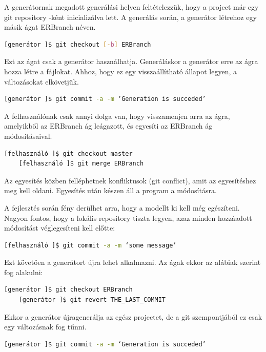\documentclass[a4paper,12pt,oneside]{report}
\begin{document}
\begin{justify}
	A generátornak megadott generálási helyen feltételezzük, hogy a project már egy git repository -ként inicializálva lett. A generálás során, a generátor létrehoz egy másik ágat ERBranch néven. 

	\begin{lstlisting}[language=bash]
	[generátor ]$ git checkout [-b] ERBranch 
	\end{lstlisting}

	Ezt az ágat csak a generátor használhatja. Generáláskor a generátor erre az ágra hozza létre a fájlokat. Ahhoz, hogy ez egy visszaállítható állapot legyen, a változásokat elkövetjük. 

	\begin{lstlisting}[language=bash]
	[generátor ]$ git commit -a -m ‘Generation is succeded’
	\end{lstlisting}

	A felhasználónak csak annyi dolga van, hogy visszamenjen arra az ágra, amelyikből az ERBranch ág leágazott, és egyesíti az ERBranch ág módosításaival.

	\begin{lstlisting}[language=bash]
	[felhasználó ]$ git checkout master
	[felhasználó ]$ git merge ERBranch
	\end{lstlisting}

	Az egyesítés közben felléphetnek konfliktusok (git conflict), amit az egyesítéshez meg kell oldani. Egyesítés után készen áll a program a módosításra.

	A fejlesztés során fény derülhet arra, hogy a modellt ki kell még egészíteni. Nagyon fontos, hogy a lokális repository tiszta legyen, azaz minden hozzáadott módosítást véglegesíteni kell előtte:

	\begin{lstlisting}[language=bash]
	[felhasználó ]$ git commit -a -m ‘some message’
	\end{lstlisting}

	Ezt követően a generátort újra lehet alkalmazni. Az ágak ekkor az alábiak szerint fog alakulni: 

	\begin{lstlisting}[language=bash]
	[generátor ]$ git checkout ERBranch
	[generátor ]$ git revert THE_LAST_COMMIT
	\end{lstlisting}

	Ekkor a generátor újragenerálja az egész projectet, de a git szempontjából ez csak egy változásnak fog tűnni. 

	\begin{lstlisting}[language=bash]
	[generátor ]$ git commit -a -m ‘Generation is succeded’
	\end{lstlisting}


\end{justify}
\end{document}

